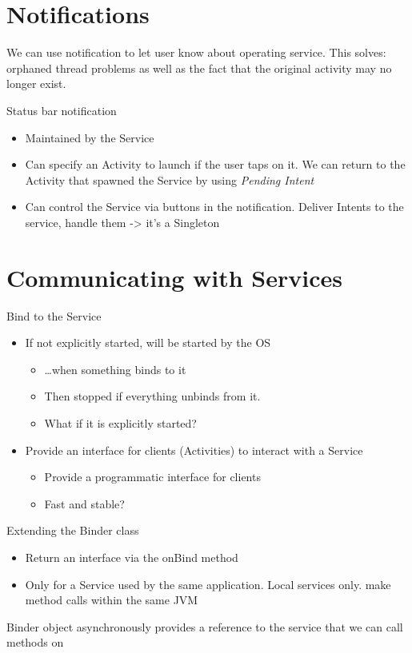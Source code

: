 \documentclass{article}
\begin{document}
\section{Notifications}

\begin{flushleft}
We can use notification to let user know about operating service. This solves: orphaned thread problems as well as the fact that the original activity may no longer exist.
\end{flushleft}
Status bar notification
\begin{itemize}
  \item Maintained by the Service
  \item Can specify an Activity to launch if the user taps on it. We can return to the Activity that spawned the Service by using \textit{Pending Intent}
  \item Can	control	the	Service	via	buttons	in	the	notification. Deliver Intents to the service, handle them -> it’s a Singleton
\end{itemize}

\section{Communicating	with	Services}
\begin{flushleft}
Bind to the Service
\begin{itemize}
  \item If not explicitly started, will be started by the OS  
  \begin{itemize}
    \item  …when something binds to it 
    \item Then stopped if everything unbinds from it.
    \item What if it is explicitly started?
  \end{itemize}
  \item  Provide an interface for clients (Activities) to interact with a Service
  \begin{itemize}  
    \item Provide a programmatic interface for clients
    \item Fast and stable?  
  \end{itemize}
\end{itemize}
Extending the Binder class
\begin{itemize}
  \item Return an interface via the onBind method
  \item Only for a Service used by the same application. Local services only. make method calls within the same JVM
\end{itemize}
Binder object asynchronously provides a reference to the service that we can call methods on
\end{flushleft}
\end{document}
